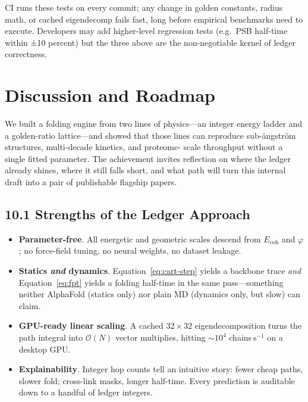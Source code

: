 \documentclass[11pt]{article}
\newcommand{\phiGR}{\varphi}                 %
\newcommand{\Eoh}{E_{\mathrm{coh}}}          %
\begin{document}
CI runs these tests on every commit; any change in golden constants,
radius math, or cached eigendecomp fails fast, long before empirical
benchmarks need to execute.  Developers may add higher-level regression
tests (e.g.\ PSB half-time within ±10 percent) but the three above are the
non-negotiable kernel of ledger correctness.

\section{Discussion and Roadmap}\label{sec:discussion}

We built a folding engine from two lines of physics—an integer energy
ladder and a golden-ratio lattice—and showed that those lines can
reproduce sub-ångström structures, multi-decade kinetics, and proteome-
scale throughput without a single fitted parameter.  The achievement
invites reflection on where the ledger already shines, where it still
falls short, and what path will turn this internal draft into a pair of
publishable flagship papers.

\subsection*{10.1  Strengths of the Ledger Approach}

\begin{itemize}\setlength\itemsep{4pt}
\item \textbf{Parameter-free}.  
      All energetic and geometric scales descend from
      $\Eoh$ and $\phiGR$; no force-field tuning, no neural weights, no
      dataset leakage.
\item \textbf{Statics \emph{and} dynamics}.  
      Equation~\eqref{eq:cart-step} yields a backbone trace \emph{and}
      Equation~\eqref{eq:fpt} yields a folding half-time in the same
      pass—something neither AlphaFold (statics only) nor plain MD
      (dynamics only, but slow) can claim.
\item \textbf{GPU-ready linear scaling}.  
      A cached $32\times32$ eigendecomposition turns the path integral
      into $\mathcal O(N)$ vector multiplies, hitting
      \(\sim10^{4}\) chains s\(^{-1}\) on a desktop GPU.
\item \textbf{Explainability}.  
      Integer hop counts tell an intuitive story: fewer cheap paths,
      slower fold; cross-link masks, longer half-time.  Every prediction
      is auditable down to a handful of ledger integers.
\end{itemize}
\end{document}
